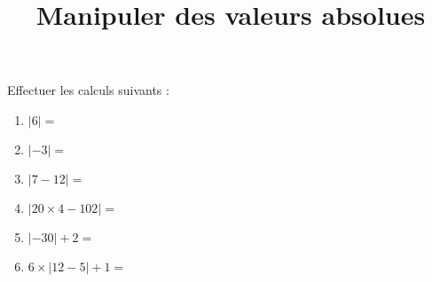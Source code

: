 \documentclass[
	classe=$2^{de}$,
	exercices=Chapitre\space 1
]{exercice}
\title{Manipuler des valeurs absolues}
\author{}
\date{}
\begin{document}
\maketitle

\begin{exercice}
	Effectuer les calculs suivants :
	\begin{enumerate}
		\item $|6| = $ 
		\item $|{-}3| = $ 
		\item $|7 - 12| = $ 
		\item $|20 × 4 - 102| = $ 
		\item $|{-}30| + 2 = $ 
		\item $6 × |12 - 5| + 1 = $ 
	\end{enumerate}
\end{exercice}
\end{document}
